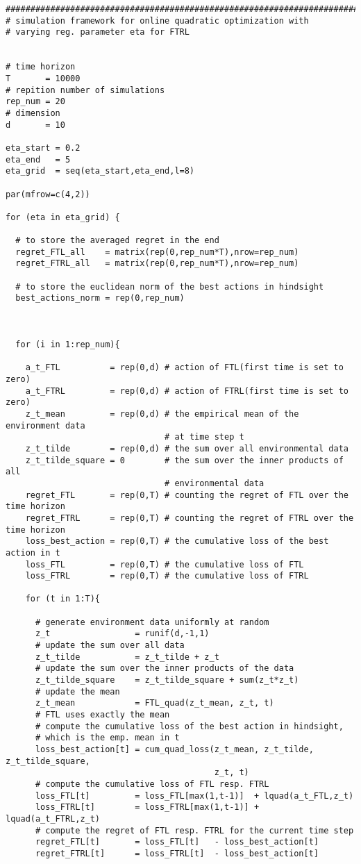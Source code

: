 \documentclass[a4paper]{article}
\begin{document}
{\begin{lstlisting}
###############################################################################
# simulation framework for online quadratic optimization with 
# varying reg. parameter eta for FTRL


# time horizon
T       = 10000
# repition number of simulations
rep_num = 20
# dimension
d       = 10

eta_start = 0.2
eta_end   = 5
eta_grid  = seq(eta_start,eta_end,l=8)

par(mfrow=c(4,2))

for (eta in eta_grid) {

  # to store the averaged regret in the end
  regret_FTL_all    = matrix(rep(0,rep_num*T),nrow=rep_num)
  regret_FTRL_all   = matrix(rep(0,rep_num*T),nrow=rep_num)
  
  # to store the euclidean norm of the best actions in hindsight
  best_actions_norm = rep(0,rep_num)
  

  
  for (i in 1:rep_num){ 
    
    a_t_FTL          = rep(0,d) # action of FTL(first time is set to zero)
    a_t_FTRL         = rep(0,d) # action of FTRL(first time is set to zero)
    z_t_mean         = rep(0,d) # the empirical mean of the environment data 
                                # at time step t
    z_t_tilde        = rep(0,d) # the sum over all environmental data
    z_t_tilde_square = 0        # the sum over the inner products of all 
                                # environmental data
    regret_FTL       = rep(0,T) # counting the regret of FTL over the time horizon 
    regret_FTRL      = rep(0,T) # counting the regret of FTRL over the time horizon
    loss_best_action = rep(0,T) # the cumulative loss of the best action in t
    loss_FTL         = rep(0,T) # the cumulative loss of FTL 
    loss_FTRL        = rep(0,T) # the cumulative loss of FTRL 
    
    for (t in 1:T){
      
      # generate environment data uniformly at random
      z_t                 = runif(d,-1,1)
      # update the sum over all data
      z_t_tilde           = z_t_tilde + z_t
      # update the sum over the inner products of the data
      z_t_tilde_square    = z_t_tilde_square + sum(z_t*z_t)
      # update the mean
      z_t_mean            = FTL_quad(z_t_mean, z_t, t) 
      # FTL uses exactly the mean
      # compute the cumulative loss of the best action in hindsight, 
      # which is the emp. mean in t
      loss_best_action[t] = cum_quad_loss(z_t_mean, z_t_tilde, z_t_tilde_square,
                                          z_t, t)
      # compute the cumulative loss of FTL resp. FTRL
      loss_FTL[t]         = loss_FTL[max(1,t-1)]  + lquad(a_t_FTL,z_t)  
      loss_FTRL[t]        = loss_FTRL[max(1,t-1)] + lquad(a_t_FTRL,z_t)
      # compute the regret of FTL resp. FTRL for the current time step
      regret_FTL[t]       = loss_FTL[t]   - loss_best_action[t]
      regret_FTRL[t]      = loss_FTRL[t]  - loss_best_action[t]
      

\end{lstlisting}}
\end{document}
